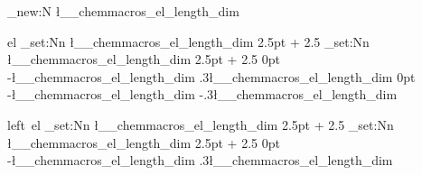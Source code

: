 \dim_new:N \l__chemmacros_el_length_dim

 { el }
  {
    \dim_set:Nn \l__chemmacros_el_length_dim
      { 2.5pt + 2.5\pgflinewidth }
    \pgfarrowsrightextend { .5\pgflinewidth }
  }
  {
    \dim_set:Nn \l__chemmacros_el_length_dim
      { 2.5pt + 2.5\pgflinewidth }
    \pgfsetdash {} { 0pt }
    \pgfsetroundjoin
    \pgfsetroundcap
    \pgfpathmoveto { \pgfpoint { 0pt } { 0pt } }
    \pgfpathlineto
      {
        \pgfpoint
          { -\l__chemmacros_el_length_dim }
          { .3\l__chemmacros_el_length_dim }
      }
    \pgfpathlineto
      {  { 0pt } }
    \pgfpathlineto
      {
        \pgfpoint
          { -\l__chemmacros_el_length_dim }
          { -.3\l__chemmacros_el_length_dim }
      }
    \pgfpathlineto { \pgfpoint { 0pt } { 0pt } }
    \pgfusepathqfillstroke
  }

 { left~el }
  {
    \dim_set:Nn \l__chemmacros_el_length_dim
      { 2.5pt + 2.5\pgflinewidth }
    \pgfarrowsrightextend { .5\pgflinewidth }
  }
  {
    \dim_set:Nn \l__chemmacros_el_length_dim
      { 2.5pt + 2.5\pgflinewidth }
    \pgfsetdash {} { 0pt }
    \pgfsetroundjoin
    \pgfsetroundcap
    \pgfpathmoveto { \pgfpoint { 0pt } { 0pt } }
    \pgfpathlineto
      {
        \pgfpoint
          { -\l__chemmacros_el_length_dim }
          { .3\l__chemmacros_el_length_dim }
      }
    \pgfpathlineto { \pgfpoint { 0pt } { 0pt } }
    \pgfusepathqfillstroke
  }

